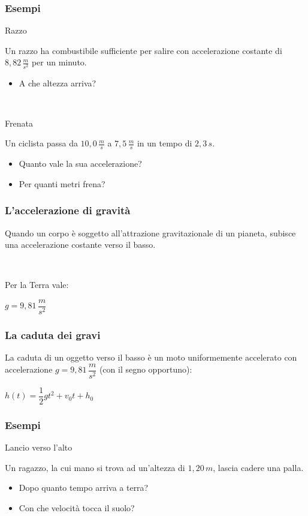 \documentclass[]{beamer}
\theoremstyle{plain}
\begin{document}
\begin{frame}
\frametitle{Esempi}
\begin{exampleblock}{Razzo}
\begin{small}
Un razzo ha combustibile sufficiente per salire con accelerazione costante di $ 8,82 \, \frac{m}{s^2} $ per un minuto.
\begin{itemize}
  \item A che altezza arriva?
\end{itemize}
\end{small}
\end{exampleblock}

~


\begin{exampleblock}{Frenata}
\begin{small}
Un ciclista passa da $ 10,0 \, \frac{m}{s} $ a $ 7,5 \, \frac{m}{s} $ in un tempo di $ 2,3 \, s $.
\begin{itemize}
  \item Quanto vale la sua accelerazione?
  \item Per quanti metri frena?
\end{itemize}
\end{small}
\end{exampleblock}

\end{frame}



\begin{frame}
\frametitle{L'accelerazione di gravità}
Quando un corpo è soggetto all'attrazione gravitazionale di un pianeta, subisce una \alert{accelerazione costante verso il basso}.\pause

~

Per la Terra vale:
\begin{center}
\colorbox{marroncino!30}{$ g = 9,81 \, \dfrac{m}{s^2} $}
\end{center}  
\end{frame}

\begin{frame}
\frametitle{La caduta dei gravi}
La caduta di un oggetto verso il basso è un moto uniformemente accelerato con accelerazione $ g = 9,81 \, \dfrac{m}{s^2} $ (con il segno opportuno):
\begin{center}
\colorbox{marroncino!30}{$ h(t) = \dfrac{1}{2} gt^2 + v_0 t + h_0 $}
\end{center}
\end{frame}

\begin{frame}
\frametitle{Esempi}
\begin{exampleblock}{Lancio verso l'alto}
\begin{small}
Un ragazzo, la cui mano si trova ad un'altezza di $ 1,20 \, m $, lascia cadere una palla.
\begin{itemize}
  \item Dopo quanto tempo arriva a terra?
  \item Con che velocità tocca il suolo?
\end{itemize}
\end{small}
\end{exampleblock}
\end{frame}
\end{document}
